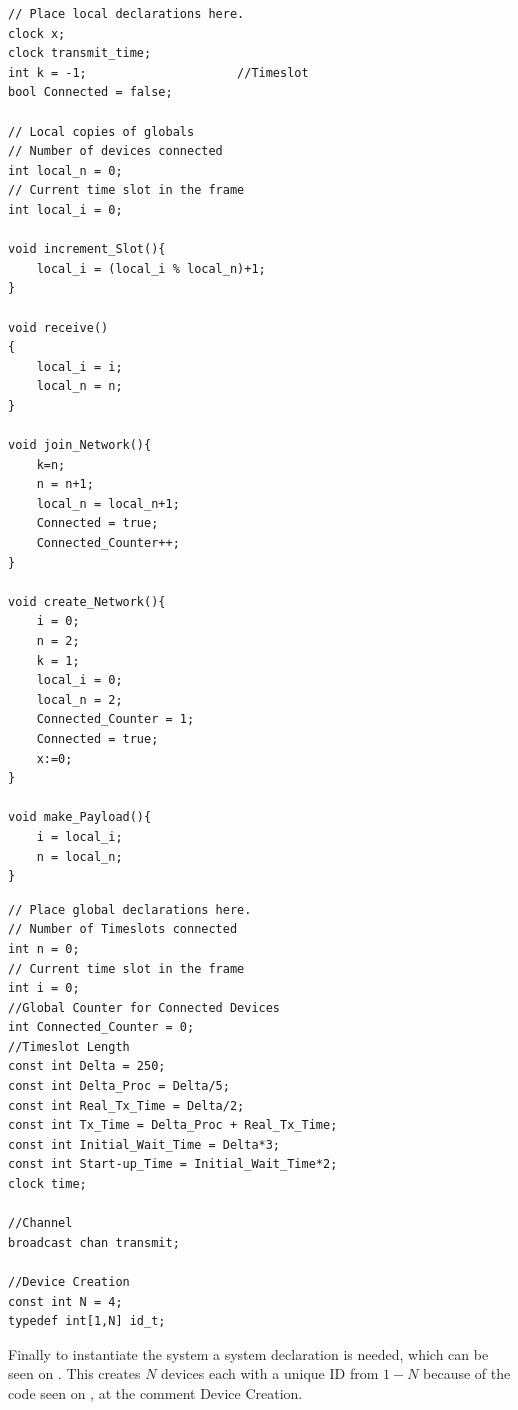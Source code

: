 \noindent\begin{minipage}{0.47\textwidth}
\begin{lstlisting}[style=UPPAAL,
caption={Local code for Device.}, label={device_local}]
// Place local declarations here.
clock x;
clock transmit_time;
int k = -1;                     //Timeslot
bool Connected = false;

// Local copies of globals
// Number of devices connected
int local_n = 0; 
// Current time slot in the frame
int local_i = 0;

void increment_Slot(){
    local_i = (local_i % local_n)+1;
}

void receive()
{
    local_i = i;
    local_n = n;
}

void join_Network(){
    k=n;
    n = n+1;
    local_n = local_n+1;
    Connected = true;
    Connected_Counter++;
}

void create_Network(){
    i = 0;
    n = 2;
    k = 1;
    local_i = 0;
    local_n = 2;
    Connected_Counter = 1;
    Connected = true;
    x:=0;
}

void make_Payload(){
    i = local_i;
    n = local_n;
}

\end{lstlisting}
\end{minipage}\hfill
\begin{minipage}{0.47\textwidth}
\begin{lstlisting}[style=UPPAAL,
caption={Code for the global declarations.}, label={uppaal_Global}]
// Place global declarations here.
// Number of Timeslots connected
int n = 0;         
// Current time slot in the frame
int i = 0;            
//Global Counter for Connected Devices                    
int Connected_Counter = 0;
//Timeslot Length
const int Delta = 250;                 
const int Delta_Proc = Delta/5;
const int Real_Tx_Time = Delta/2;
const int Tx_Time = Delta_Proc + Real_Tx_Time;
const int Initial_Wait_Time = Delta*3;
const int Start-up_Time = Initial_Wait_Time*2;
clock time;

//Channel
broadcast chan transmit;

//Device Creation
const int N = 4;
typedef int[1,N] id_t;
\end{lstlisting}
\end{minipage}

\noindent
Finally to instantiate the system a system declaration is needed, which can be seen on .
This creates $N$ devices each with a unique ID from $1 - N$ because of the code seen on , at the comment Device Creation.

